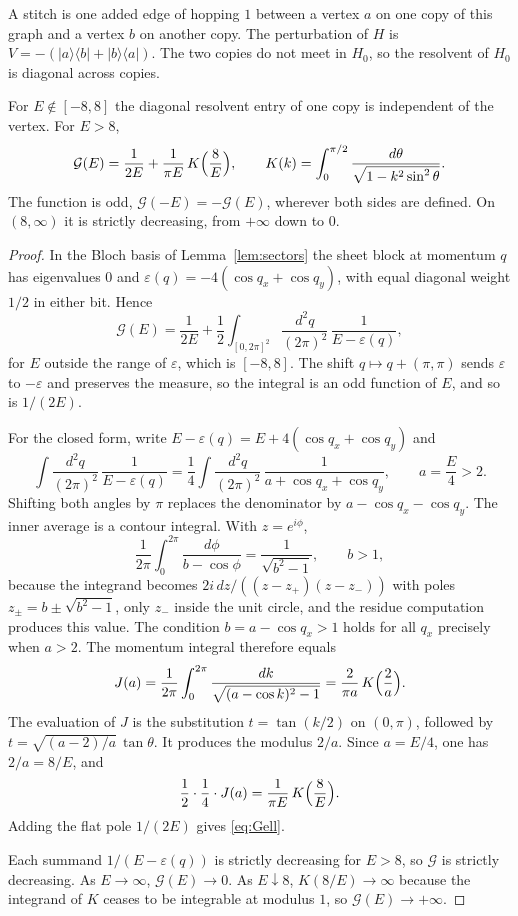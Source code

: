 A stitch is one added edge of hopping \(1\) between a vertex \(a\) on one
copy of this graph and a vertex \(b\) on another copy.
The perturbation of \(H\) is
\(V=-(|a\rangle\langle b|+|b\rangle\langle a|)\).
The two copies do not meet in \(H_0\), so the resolvent of \(H_0\) is
diagonal across copies.

\begin{proposition}
\label{prop:green}
For \(E\notin[-8,8]\) the diagonal resolvent entry of one copy is independent
of the vertex.
For \(E>8\),
\begin{equation}
\label{eq:Gell}
\mathcal{G}(E)
=\frac{1}{2E}+\frac{1}{\pi E}\,K\Bigl(\frac{8}{E}\Bigr),
\qquad
K(k)=\int_0^{\pi/2}\frac{d\theta}{\sqrt{1-k^2\sin^2\theta}}.
\end{equation}
The function is odd, \(\mathcal{G}(-E)=-\mathcal{G}(E)\), wherever both sides are defined.
On \((8,\infty)\) it is strictly decreasing, from \(+\infty\) down to \(0\).
\end{proposition}

\begin{proof}
In the Bloch basis of Lemma~\ref{lem:sectors} the sheet block at momentum
\(q\) has eigenvalues \(0\) and \(\varepsilon(q)=-4(\cos q_x+\cos q_y)\),
with equal diagonal weight \(1/2\) in either bit.
Hence
\[
\mathcal{G}(E)=\frac{1}{2E}
+\frac12\int_{[0,2\pi]^2}\frac{d^2q}{(2\pi)^2}\,
\frac{1}{E-\varepsilon(q)},
\]
for \(E\) outside the range of \(\varepsilon\), which is \([-8,8]\).
The shift \(q\mapsto q+(\pi,\pi)\) sends \(\varepsilon\) to \(-\varepsilon\) and
preserves the measure, so the integral is an odd function of \(E\), and
so is \(1/(2E)\).

For the closed form, write \(E-\varepsilon(q)=E+4(\cos q_x+\cos q_y)\) and
\[
\int\frac{d^2q}{(2\pi)^2}\,\frac{1}{E-\varepsilon(q)}
=\frac14\int\frac{d^2q}{(2\pi)^2}\,
\frac{1}{a+\cos q_x+\cos q_y},
\qquad a=\frac{E}{4}>2.
\]
Shifting both angles by \(\pi\) replaces the denominator by
\(a-\cos q_x-\cos q_y\).
The inner average is a contour integral.
With \(z=e^{i\phi}\),
\[
\frac{1}{2\pi}\int_0^{2\pi}\frac{d\phi}{b-\cos\phi}
=\frac{1}{\sqrt{b^2-1}},\qquad b>1,
\]
because the integrand becomes
\(2i\,dz/((z-z_+)(z-z_-))\) with poles
\(z_\pm=b\pm\sqrt{b^2-1}\), only \(z_-\) inside the unit circle, and the
residue computation produces this value.
The condition \(b=a-\cos q_x>1\) holds for all \(q_x\) precisely when \(a>2\).
The momentum integral therefore equals
\[
J(a)=\frac{1}{2\pi}\int_0^{2\pi}
\frac{dk}{\sqrt{(a-\cos k)^2-1}}
=\frac{2}{\pi a}\,K\Bigl(\frac{2}{a}\Bigr).
\]
The evaluation of \(J\) is the substitution \(t=\tan(k/2)\) on \((0,\pi)\),
followed by \(t=\sqrt{(a-2)/a}\,\tan\theta\).
It produces the modulus \(2/a\).
Since \(a=E/4\), one has \(2/a=8/E\), and
\[
\frac12\cdot\frac14\cdot J(a)
=\frac{1}{\pi E}\,K\Bigl(\frac{8}{E}\Bigr).
\]
Adding the flat pole \(1/(2E)\) gives \eqref{eq:Gell}.

Each summand \(1/(E-\varepsilon(q))\) is strictly decreasing for \(E>8\), so
\(\mathcal{G}\) is strictly decreasing.
As \(E\to\infty\), \(\mathcal{G}(E)\to 0\).
As \(E\downarrow 8\), \(K(8/E)\to\infty\) because the integrand of \(K\)
ceases to be integrable at modulus \(1\), so \(\mathcal{G}(E)\to+\infty\).
\end{proof}

